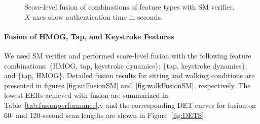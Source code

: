 \begin{figure}[t]
 \centering
{}
\caption{Score-level fusion of combinations of feature types with SM verifier. $X$ axes show authentication time in seconds.}
\end{figure}





\paragraph{Fusion of HMOG, Tap, and Keystroke Features} We used SM verifier and performed score-level fusion with the following feature combinations: \{HMOG, tap, keystroke dynamics\};  \{tap, keystroke dynamics\}; and \{tap, HMOG\}. Detailed fusion results for sitting  and walking conditions are presented in figures \ref{fig:sitFusionSM} and~\ref{fig:walkFusionSM}, respectively. The lowest EERs achieved with fusion are summarized in Table~\ref{tab:fusionperformance},v and the corresponding DET curves for fusion on 60- and 120-second scan lengths are shown in Figure~\ref{fig:DETS}. %

